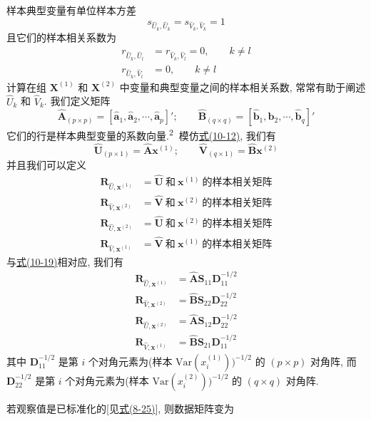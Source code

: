 样本典型变量有单位样本方差
\label{eq:10-25}
\begin{equation}
s_{\hat{U}_k,\hat{U}_k}=s_{\hat{V}_k,\hat{V}_k}=1
\tag{10-25}
\end{equation}
且它们的样本相关系数为
\label{eq:10-26}
\begin{equation}
\begin{aligned}
r_{\hat{U}_k,\hat{U}_l}&=r_{\hat{V}_k,\hat{V}_l}=0,\qquad k\ne l\\
r_{\hat{U}_k,\hat{V}_l}&=0,\qquad k\ne l
\end{aligned}
\tag{10-26}
\end{equation}
计算在组 $\mathbf{X}^{(1)}$ 和 $\mathbf{X}^{(2)}$ 中变量和典型变量之间的样本相关系数, 常常有助于阐述 $\hat{U}_k$ 和 $\hat{V}_k$. 我们定义矩阵
\label{eq:10-27}
\begin{equation}
\hat{\mathbf{A}}_{(p\times p)}=[\hat{\mathbf{a}}_1,\hat{\mathbf{a}}_2,\cdots,\hat{\mathbf{a}}_p]';\qquad \hat{\mathbf{B}}_{(q\times q)}=[\hat{\mathbf{b}}_1,\hat{\mathbf{b}}_2,\cdots,\hat{\mathbf{b}}_q]'
\tag{10-27}
\end{equation}
它们的行是样本典型变量的系数向量.\textsuperscript{\textcircled{2}} 模仿\hyperref[eq:10-12]{式(10-12)}, 我们有
\label{eq:10-28}
\begin{equation}
\hat{\mathbf{U}}_{(p\times 1)}=\hat{\mathbf{A}}\mathbf{x}^{(1)};\qquad \hat{\mathbf{V}}_{(q\times 1)}=\hat{\mathbf{B}}\mathbf{x}^{(2)}
\tag{10-28}
\end{equation}
并且我们可以定义
\[
\begin{aligned}
\mathbf{R}_{\hat{U},\mathbf{x}^{(1)}}&=\hat{\mathbf{U}}\ \text{和}\ \mathbf{x}^{(1)}\ \text{的样本相关矩阵}\\
\mathbf{R}_{\hat{V},\mathbf{x}^{(2)}}&=\hat{\mathbf{V}}\ \text{和}\ \mathbf{x}^{(2)}\ \text{的样本相关矩阵}\\
\mathbf{R}_{\hat{U},\mathbf{x}^{(2)}}&=\hat{\mathbf{U}}\ \text{和}\ \mathbf{x}^{(2)}\ \text{的样本相关矩阵}\\
\mathbf{R}_{\hat{V},\mathbf{x}^{(1)}}&=\hat{\mathbf{V}}\ \text{和}\ \mathbf{x}^{(1)}\ \text{的样本相关矩阵}
\end{aligned}
\]
与\hyperref[eq:10-19]{式(10-19)}相对应, 我们有
\label{eq:10-29}
\begin{equation}
\begin{aligned}
\mathbf{R}_{\hat{U},\mathbf{x}^{(1)}}&=\hat{\mathbf{A}}\mathbf{S}_{11}\mathbf{D}_{11}^{-1/2}\\
\mathbf{R}_{\hat{V},\mathbf{x}^{(2)}}&=\hat{\mathbf{B}}\mathbf{S}_{22}\mathbf{D}_{22}^{-1/2}\\
\mathbf{R}_{\hat{U},\mathbf{x}^{(2)}}&=\hat{\mathbf{A}}\mathbf{S}_{12}\mathbf{D}_{22}^{-1/2}\\
\mathbf{R}_{\hat{V},\mathbf{x}^{(1)}}&=\hat{\mathbf{B}}\mathbf{S}_{21}\mathbf{D}_{11}^{-1/2}
\end{aligned}
\tag{10-29}
\end{equation}
其中 $\mathbf{D}_{11}^{-1/2}$ 是第 $i$ 个对角元素为(样本 $\mathrm{Var}(x_i^{(1)}))^{-1/2}$ 的 $(p\times p)$ 对角阵, 而 $\mathbf{D}_{22}^{-1/2}$ 是第 $i$ 个对角元素为(样本 $\mathrm{Var}(x_i^{(2)}))^{-1/2}$ 的 $(q\times q)$ 对角阵.

\noindent{}\quad 若观察值是已标准化的[见\hyperref[eq:8-25]{式(8-25)}], 则数据矩阵变为
